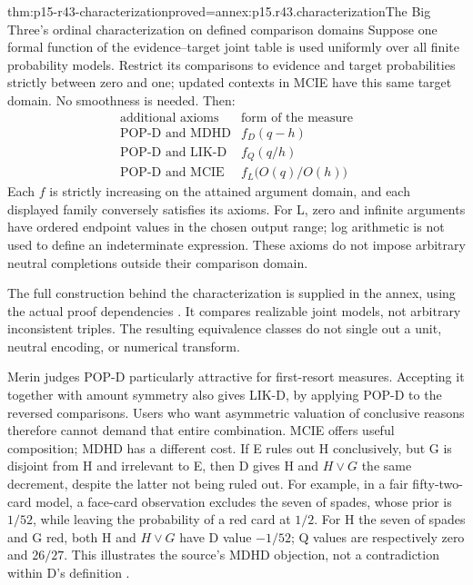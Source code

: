 \begin{hbtheorem}{thm:p15-r43-characterization}{proved=annex:p15.r43.characterization}{The Big Three's ordinal characterization on defined comparison domains}
Suppose one formal function of the evidence--target joint table is used
uniformly over all finite probability models. Restrict its comparisons
to evidence and target probabilities strictly between zero and one;
updated contexts in MCIE have this same target domain. No smoothness
is needed. Then:
\[
 \begin{array}{c|c}
 \text{additional axioms}&\text{form of the measure}\\\hline
 \text{POP-D and MDHD}&f_D(q-h)\\
 \text{POP-D and LIK-D}&f_Q(q/h)\\
 \text{POP-D and MCIE}&f_L\bigl(O(q)/O(h)\bigr)
 \end{array}
\]
Each \(f\) is strictly increasing on the attained argument domain,
and each displayed family conversely satisfies its axioms.
For L, zero and infinite arguments have ordered endpoint values in
the chosen output range; log arithmetic is not used to define an
indeterminate expression.
These axioms do not impose arbitrary neutral completions outside their
comparison domain.
\end{hbtheorem}

The full construction behind the characterization is supplied in the
annex, using the actual proof dependencies
\parencite[pp.~192--201]{CrupiChaterTentori2013Axioms}
\parencite[pp.~654--656, 662--665]{CrupiTentori2016Confirmation}.
It compares realizable joint models, not arbitrary inconsistent triples.
The resulting equivalence classes do not single out a unit, neutral
encoding, or numerical transform.

Merin judges POP-D particularly attractive for first-resort measures.
Accepting it together with amount symmetry also gives LIK-D, by applying
POP-D to the reversed comparisons. Users who want asymmetric valuation
of conclusive reasons therefore cannot demand that entire combination.
MCIE offers useful composition; MDHD has a different cost. If E rules
out H conclusively, but G is disjoint from H and irrelevant to E, then
D gives H and \(H\vee G\) the same decrement, despite the latter not
being ruled out. For example, in a fair fifty-two-card model, a face-card
observation excludes the seven of spades, whose prior is \(1/52\),
while leaving the probability of a red card at \(1/2\). For H the
seven of spades and G red, both H and \(H\vee G\) have D value
\(-1/52\); Q values are respectively zero and \(26/27\).
This illustrates the source's MDHD objection, not a contradiction
within D's definition
\parencite[pp.~270--271 and p.~274, nn.~11--14]{Merin2021Relevance}.

